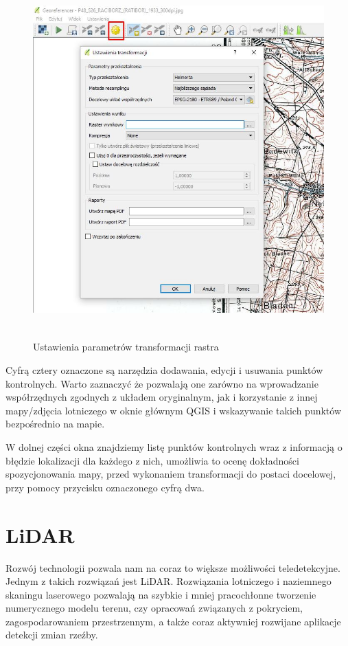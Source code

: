 \documentclass[12pt,a4paper]{book}
\begin{document}
\begin{center}
\begin{figure}
\includegraphics[width=13cm,height=13.702cm]{004-georef-transf.jpg}
\caption{Ustawienia parametrów transformacji rastra}
\end{figure}
\end{center}
Cyfrą cztery oznaczone są narzędzia dodawania, edycji i usuwania punktów kontrolnych. Warto zaznaczyć że pozwalają one zarówno na wprowadzanie współrzędnych zgodnych z układem oryginalnym, jak i korzystanie z innej mapy/zdjęcia lotniczego w oknie głównym QGIS i wskazywanie takich punktów bezpośrednio na mapie.

W dolnej części okna znajdziemy listę punktów kontrolnych wraz z informacją o błędzie lokalizacji dla każdego z nich, umożliwia to ocenę dokładności spozycjonowania mapy, przed wykonaniem transformacji do postaci docelowej, przy pomocy przycisku oznaczonego cyfrą dwa.


\chapter{LiDAR}
Rozwój technologii pozwala nam na coraz to większe możliwości teledetekcyjne. Jednym z takich rozwiązań jest LiDAR. Rozwiązania lotniczego i naziemnego skaningu laserowego pozwalają na szybkie i mniej pracochłonne tworzenie numerycznego modelu terenu, czy opracowań związanych z pokryciem, zagospodarowaniem przestrzennym, a także coraz aktywniej rozwijane aplikacje detekcji zmian rzeźby.
\end{document}
